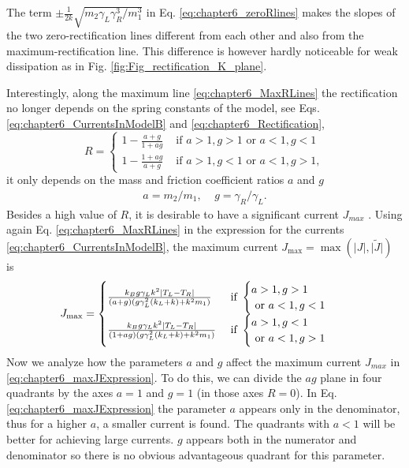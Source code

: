 %
The term $\pm\frac{1}{2k}\sqrt{{m_2\gamma_L\gamma_R^3}/{m_1^3}}$ in Eq. \eqref{eq:chapter6_zeroRlines} makes the slopes of the
two zero-rectification lines different from each other and also from the maximum-rectification line. This difference is however
hardly noticeable for weak dissipation as in  Fig. \ref{fig:Fig_rectification_K_plane}.

Interestingly, along the maximum line  \eqref{eq:chapter6_MaxRLines} the rectification no longer depends on the spring constants of the model,
see  Eqs. \eqref{eq:chapter6_CurrentsInModelB}  and \eqref{eq:chapter6_Rectification},
%
\begin{equation}
    R=
    \begin{cases}
      1-\frac{a+g}{1+ag} &\text{ if }a>1,g>1\text{ or }a<1,g<1\\
      1-\frac{1+ag}{a+g} &\text{ if }a>1,g<1\text{ or }a<1,g>1,
    \end{cases}
  \label{eq:chapter6_maxRExpression}
\end{equation}
%
it only depends on the mass and friction coefficient ratios $a$ and $g$
%
\begin{align}
  a = m_2/m_1,\;\;\;\;
  g = \gamma_R/\gamma_L.
\end{align}
%
Besides a high value of $R$, it is desirable to have a significant current $J_{max}$
\cite{Simon2019}. Using again  Eq. \eqref{eq:chapter6_MaxRLines} in the expression for the currents \eqref{eq:chapter6_CurrentsInModelB}, the maximum current $J_{\max} = \max(\big|{J}\big|,\big|\tilde{J}\big|)$ is
%
\begin{align}
    &J_{\max}=\begin{cases}
   \frac{k_B g\gamma_L k^2 \abs{T_L-T_R}}{(a+g)(g\gamma_L^2(k_L+k)+k^2m_1)} &
   \text{ if }\begin{cases}a>1,g>1\\
   \text{ or }a<1,g<1\end{cases}
    \\
    \frac{k_B g\gamma_L k^2 \abs{T_L-T_R}}{(1+ag)(g\gamma_L^2(k_L+k)+k^2m_1)}&\text{ if }
    \begin{cases}a>1,g<1
    \\\text{ or }a<1,g>1\end{cases}
    \end{cases}
    \label{eq:chapter6_maxJExpression}
\end{align}
%
Now we analyze how the parameters $a$ and $g$ affect the maximum current $J_{max}$ in \eqref{eq:chapter6_maxJExpression}. To do this, we can divide the $ag$ plane in four quadrants by the axes $a = 1$ and $g = 1$ (in those axes $R = 0$). In Eq. \eqref{eq:chapter6_maxJExpression} the parameter $a$ appears only in the denominator, thus for a higher $a$, a smaller current is found. The quadrants with $a < 1$ will be better for achieving large currents. $g$ appears both in the numerator and denominator so there is no obvious advantageous quadrant for this parameter.

